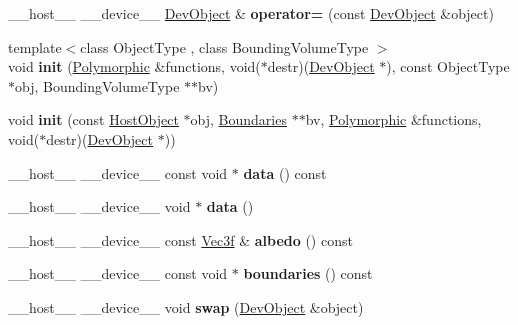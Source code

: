 \begin{DoxyCompactItemize}
\item 
\+\_\+\+\_\+host\+\_\+\+\_\+ \+\_\+\+\_\+device\+\_\+\+\_\+ \hyperlink{class_dev_object}{Dev\+Object} \& {\bfseries operator=} (const \hyperlink{class_dev_object}{Dev\+Object} \&object)\hypertarget{class_dev_object_af462dd37c4711a714f3a9d8d5d5f51fe}{}\label{class_dev_object_af462dd37c4711a714f3a9d8d5d5f51fe}

\item 
{\footnotesize template$<$class Object\+Type , class Bounding\+Volume\+Type $>$ }\\void {\bfseries init} (\hyperlink{struct_polymorphic}{Polymorphic} \&functions, void($\ast$destr)(\hyperlink{class_dev_object}{Dev\+Object} $\ast$), const Object\+Type $\ast$obj, Bounding\+Volume\+Type $\ast$$\ast$bv)\hypertarget{class_dev_object_a4eba0664c29dc32891f074b664e7d52d}{}\label{class_dev_object_a4eba0664c29dc32891f074b664e7d52d}

\item 
void {\bfseries init} (const \hyperlink{class_host_object}{Host\+Object} $\ast$obj, \hyperlink{class_boundaries}{Boundaries} $\ast$$\ast$bv, \hyperlink{struct_polymorphic}{Polymorphic} \&functions, void($\ast$destr)(\hyperlink{class_dev_object}{Dev\+Object} $\ast$))\hypertarget{class_dev_object_a71a495db8891a7a000e70fbd70876f9c}{}\label{class_dev_object_a71a495db8891a7a000e70fbd70876f9c}

\item 
\+\_\+\+\_\+host\+\_\+\+\_\+ \+\_\+\+\_\+device\+\_\+\+\_\+ const void $\ast$ {\bfseries data} () const\hypertarget{class_dev_object_a583a12e2696993b1823a88a51f17b3d2}{}\label{class_dev_object_a583a12e2696993b1823a88a51f17b3d2}

\item 
\+\_\+\+\_\+host\+\_\+\+\_\+ \+\_\+\+\_\+device\+\_\+\+\_\+ void $\ast$ {\bfseries data} ()\hypertarget{class_dev_object_a695a417ce54e75738c68f96b876c72f1}{}\label{class_dev_object_a695a417ce54e75738c68f96b876c72f1}

\item 
\+\_\+\+\_\+host\+\_\+\+\_\+ \+\_\+\+\_\+device\+\_\+\+\_\+ const \hyperlink{class_vec3}{Vec3f} \& {\bfseries albedo} () const\hypertarget{class_dev_object_ac2e6196d3fd0fbaf716c8d75775e1af5}{}\label{class_dev_object_ac2e6196d3fd0fbaf716c8d75775e1af5}

\item 
\+\_\+\+\_\+host\+\_\+\+\_\+ \+\_\+\+\_\+device\+\_\+\+\_\+ const void $\ast$ {\bfseries boundaries} () const\hypertarget{class_dev_object_aadbd646c0429fc1e6ddaece4d72f4bf2}{}\label{class_dev_object_aadbd646c0429fc1e6ddaece4d72f4bf2}

\item 
\+\_\+\+\_\+host\+\_\+\+\_\+ \+\_\+\+\_\+device\+\_\+\+\_\+ void {\bfseries swap} (\hyperlink{class_dev_object}{Dev\+Object} \&object)\hypertarget{class_dev_object_a56cf3cfc311cfe04da3b45f80e36625e}{}\label{class_dev_object_a56cf3cfc311cfe04da3b45f80e36625e}

\end{DoxyCompactItemize}
